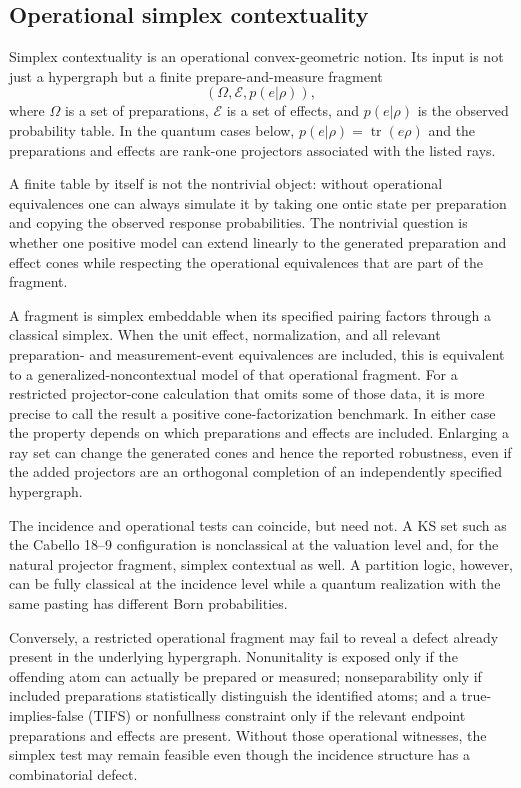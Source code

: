 \documentclass[aps,pra,twocolumn,superscriptaddress,nofootinbib]{revtex4-2}
\newcommand{\E}{\mathcal{E}}
\newcommand{\OmegaSet}{\Omega}
\newcommand{\tr}{\operatorname{tr}}
\begin{document}
\subsection{Operational simplex contextuality}

Simplex contextuality is an operational convex-geometric notion.  Its input is not just a hypergraph but a finite prepare-and-measure fragment
\begin{equation}
        (\OmegaSet,\E,p(e|\rho)),
\end{equation}
where $\OmegaSet$ is a set of preparations, $\E$ is a set of effects, and $p(e|\rho)$ is the observed probability table.  In the quantum cases below, $p(e|\rho)=\tr(e\rho)$ and the preparations and effects are rank-one projectors associated with the listed rays.

A finite table by itself is not the nontrivial object: without operational
equivalences one can always simulate it by taking one ontic state per
preparation and copying the observed response probabilities.  The nontrivial
question is whether one positive model can extend linearly to the generated
preparation and effect cones while respecting the operational equivalences that
are part of the fragment.

A fragment is simplex embeddable when its specified pairing factors through a
classical simplex.  When the unit effect, normalization, and all relevant
preparation- and measurement-event equivalences are included, this is
equivalent to a generalized-noncontextual model of that operational fragment.
For a restricted projector-cone calculation that omits some of those data, it
is more precise to call the result a positive cone-factorization benchmark.
In either case the property depends on which preparations and effects are
included.  Enlarging a ray set can change the generated cones and hence the
reported robustness, even if the added projectors are an orthogonal completion
of an independently specified hypergraph.

The incidence and operational tests can coincide, but need not.  A KS set such
as the Cabello 18--9 configuration is nonclassical at the valuation level and,
for the natural projector fragment, simplex contextual as well.  A partition
logic, however, can be fully classical at the incidence level while a quantum
realization with the same pasting has different Born probabilities.

Conversely, a restricted operational fragment may fail to reveal a defect
already present in the underlying hypergraph.  Nonunitality is exposed only if
the offending atom can actually be prepared or measured; nonseparability only
if included preparations statistically distinguish the identified atoms; and
a true-implies-false (TIFS) or nonfullness constraint only if the relevant
endpoint preparations and effects are present.  Without those operational
witnesses, the simplex test may remain feasible even though the incidence
structure has a combinatorial defect.
\end{document}
